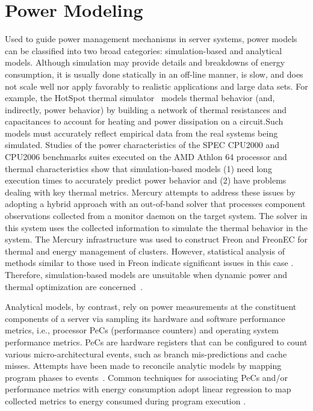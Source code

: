 \section{Power Modeling}
\label{sec:related-power-modeling} Used to guide power management
mechanisms in server systems, power models can be classified into two
broad categories: simulation-based and analytical models. Although
simulation may provide details and breakdowns of energy consumption, it
is usually done statically in an off-line manner, is slow, and does not
scale well nor apply favorably to realistic applications and large data
sets. For example, the HotSpot thermal simulator~\cite{Skadron2004}
models thermal behavior (and, indirectly, power behavior) by building a
network of thermal resistances and capacitances to account for heating
and power dissipation on a circuit.Such models must accurately reflect
empirical data from the real systems being simulated. Studies of the
power characteristics of the SPEC CPU2000 and CPU2006 benchmarks suites
executed on the AMD Athlon 64 processor \cite{MesaMartinez2007} and
thermal characteristics \cite{MesaMartinez2010} show that
simulation-based models (1) need long execution times to accurately
predict power behavior and (2) have problems dealing with key thermal
metrics.  Mercury \cite{Heath2006} attempts to address these issues by
adopting a hybrid approach with an out-of-band solver that processes
component observations collected from a monitor daemon on the target
system.  The solver in this system uses the collected information to
simulate the thermal behavior in the system.  The Mercury infrastructure
was used to construct Freon and FreonEC for thermal and energy
management of clusters. However, statistical analysis of methods similar
to those used in Freon indicate significant issues in this case
\cite{DavisRivoire2011}. Therefore, simulation-based models are
unsuitable when dynamic power and thermal optimization are
concerned~\cite{Economou2006}.
 
Analytical models, by contrast, rely on power measurements at the
constituent components of a server via sampling its hardware and
software performance metrics, i.e., processor PeCs (performance
counters) and operating system performance metrics.  PeCs are hardware
registers that can be configured to count various micro-architectural
events, such as branch mis-predictions and cache misses.  Attempts have
been made to reconcile analytic models by mapping program phases to
events~\cite{Isci2006}.  Common techniques for associating PeCs and/or
performance metrics with energy consumption adopt linear regression to
map collected metrics to energy consumed during program execution
\cite{Contreras2005,Economou2006,Isci2003b}.


